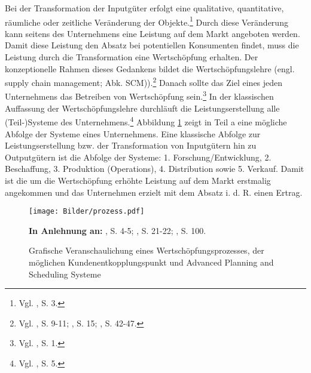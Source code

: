 Bei der Transformation der Inputgüter erfolgt eine qualitative, quantitative, räumliche oder zeitliche Veränderung der Objekte.\footnote{Vgl. \cite{Dyckhoff2010}, S. 3.} Durch diese Veränderung kann seitens des Unternehmens eine Leistung auf dem Markt angeboten werden. Damit diese Leistung den Absatz bei potentiellen Konsumenten findet, muss die Leistung durch die Transformation eine Wertschöpfung erhalten. Der konzeptionelle Rahmen dieses Gedankens bildet die Wertschöpfungslehre (engl. supply chain management; Abk. SCM)).\footnote{Vgl. \cite{Stadtler:2005aa}, S. 9-11; \cite{christopher1998logistics}, S. 15; \cite{oliver1982supply}, S. 42-47.} Danach sollte das Ziel eines jeden Unternehmens das Betreiben von Wertschöpfung sein.\footnote{Vgl. \cite{Bach:2012aa}, S. 1.} In der klassischen Auffassung der Wertschöpfungslehre durchläuft die Leistungserstellung alle (Teil-)Systeme des Unternehmens.\footnote{Vgl. \cite{Werner:2013aa}, S. 5.} Abbildung \ref{Prozess} zeigt in Teil a eine mögliche Abfolge der Systeme eines Unternehmens. Eine klassische Abfolge zur Leistungserstellung bzw. der Transformation von Inputgütern hin zu Outputgütern ist die Abfolge der Systeme: 1. Forschung/Entwicklung, 2. Beschaffung, 3. Produktion (Operations), 4. Distribution sowie 5. Verkauf. Damit ist die um die Wertschöpfung erhöhte Leistung auf dem Markt erstmalig angekommen und das Unternehmen erzielt mit dem Absatz i. d. R. einen Ertrag.

\begin{figure}[h!]
  \begin{center}
    \texttt{[image: Bilder/prozess.pdf]}
    \caption{Grafische Veranschaulichung eines Wertschöpfungsprozesses, der möglichen Kundenentkopplungspunkt und Advanced Planning and Scheduling Systeme}  \label{Prozess}
    {\footnotesize \textbf{In Anlehnung an:} \cite{Bach:2012aa}, S. 4-5; \cite{quante2009management}, S. 21-22; \cite{meyr2015structure}, S. 100.}
  \end{center}
\end{figure}

